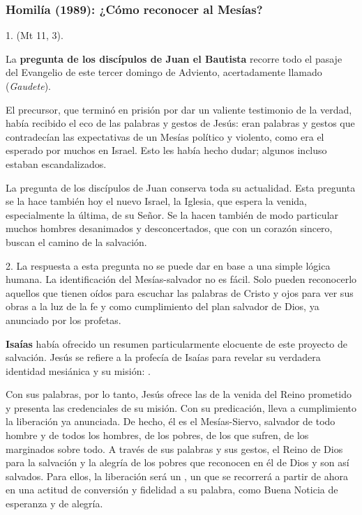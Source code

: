 			\subsubsection{Homilía (1989): ¿Cómo reconocer al Mesías?}
				
				\begin{body}
					1.  (Mt 11, 3).
					
					La \textbf{pregunta de los discípulos de Juan el Bautista} recorre todo el pasaje del Evangelio de este tercer domingo de Adviento, acertadamente llamado  (\emph{Gaudete}).
					
					El precursor, que terminó en prisión por dar un valiente testimonio de la verdad, había recibido el eco de las palabras y gestos de Jesús: eran palabras y gestos que contradecían las expectativas de un Mesías político y violento, como era el esperado por muchos en Israel. Esto les había hecho dudar; algunos incluso estaban escandalizados.
					
					 La pregunta de los discípulos de Juan conserva toda su actualidad. Esta pregunta se la hace también hoy el nuevo Israel, la Iglesia, que espera la venida, especialmente la última, de su Señor. Se la hacen también de modo particular muchos hombres desanimados y desconcertados, que con un corazón sincero, buscan el camino de la salvación.
					
					2. La respuesta a esta pregunta no se puede dar en base a una simple lógica humana. La identificación del Mesías-salvador no es fácil. Solo pueden reconocerlo aquellos que tienen oídos para escuchar las palabras de Cristo y ojos para ver sus obras a la luz de la fe y como cumplimiento del plan salvador de Dios, ya anunciado por los profetas.
					
					\textbf{Isaías} había ofrecido un resumen particularmente elocuente de este proyecto de salvación. Jesús se refiere a la profecía de Isaías para revelar su verdadera identidad mesiánica y su misión: .
					
					Con sus palabras, por lo tanto, Jesús ofrece las  de la venida del Reino prometido y presenta las credenciales de su misión. Con su predicación, lleva a cumplimiento la liberación ya anunciada. De hecho, él es el Mesías-Siervo, salvador de todo hombre y de todos los hombres, de los pobres, de los que sufren, de los marginados sobre todo. A través de sus palabras y sus gestos, el Reino de Dios  para la salvación y la alegría de los pobres que reconocen en él  de Dios y son así salvados. Para ellos, la liberación será un , un  que se recorrerá a partir de ahora en una actitud de conversión y fidelidad a su palabra, como Buena Noticia de esperanza y de alegría.
					

\end{body}

